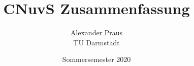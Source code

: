 \documentclass[12pt,a4paper]{article}
\title{CNuvS Zusammenfassung}
\date{Sommersemester 2020}
\author{Alexander Praus \\ TU Darmstadt}
\begin{document}
    \maketitle

    \pagebreak
    
    \tableofcontents

    

    

    

    

    

    

    
\end{document}
